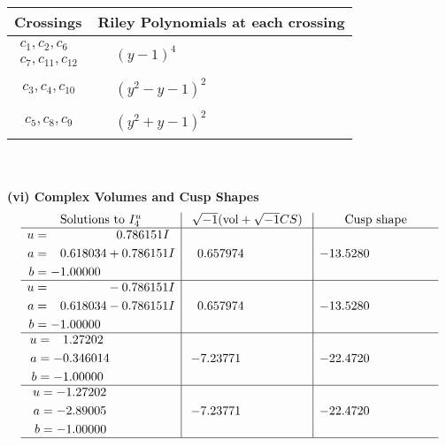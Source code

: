 \documentclass[1p]{elsarticle_modified}
\theoremstyle{definition}
\newcommand{\I}{\sqrt{-1}}
\begin{document}
\begin{tabular}{m{50pt}|m{274pt}}
Crossings & \hspace{64pt}Riley Polynomials at each crossing \\
\hline $$\begin{aligned}c_{1},c_{2},c_{6}\\c_{7},c_{11},c_{12}\end{aligned}$$&$\begin{aligned}
&(y-1)^4
\end{aligned}$\\
\hline $$\begin{aligned}c_{3},c_{4},c_{10}\end{aligned}$$&$\begin{aligned}
&(y^2- y-1)^2
\end{aligned}$\\
\hline $$\begin{aligned}c_{5},c_{8},c_{9}\end{aligned}$$&$\begin{aligned}
&(y^2+y-1)^2
\end{aligned}$\\
\hline
\end{tabular}\\~\\
\newpage\flushleft \textbf{(vi) Complex Volumes and Cusp Shapes}
$$\begin{array}{c|c|c}  
\text{Solutions to }I^u_{4}& \I (\text{vol} + \sqrt{-1}CS) & \text{Cusp shape}\\
 \hline 
\begin{aligned}
u &= \phantom{-0.000000 -}0.786151 I \\
a &= \phantom{-}0.618034 + 0.786151 I \\
b &= -1.00000\phantom{ +0.000000I}\end{aligned}
 & \phantom{-}0.657974\phantom{ +0.000000I} & -13.5280\phantom{ +0.000000I} \\ \hline\begin{aligned}
u &= \phantom{-0.000000 } -0.786151 I \\
a &= \phantom{-}0.618034 - 0.786151 I \\
b &= -1.00000\phantom{ +0.000000I}\end{aligned}
 & \phantom{-}0.657974\phantom{ +0.000000I} & -13.5280\phantom{ +0.000000I} \\ \hline\begin{aligned}
u &= \phantom{-}1.27202\phantom{ +0.000000I} \\
a &= -0.346014\phantom{ +0.000000I} \\
b &= -1.00000\phantom{ +0.000000I}\end{aligned}
 & -7.23771\phantom{ +0.000000I} & -22.4720\phantom{ +0.000000I} \\ \hline\begin{aligned}
u &= -1.27202\phantom{ +0.000000I} \\
a &= -2.89005\phantom{ +0.000000I} \\
b &= -1.00000\phantom{ +0.000000I}\end{aligned}
 & -7.23771\phantom{ +0.000000I} & -22.4720\phantom{ +0.000000I}\\
 \hline 
 \end{array}$$\newpage\newpage\renewcommand{\arraystretch}{1}
\end{document}
